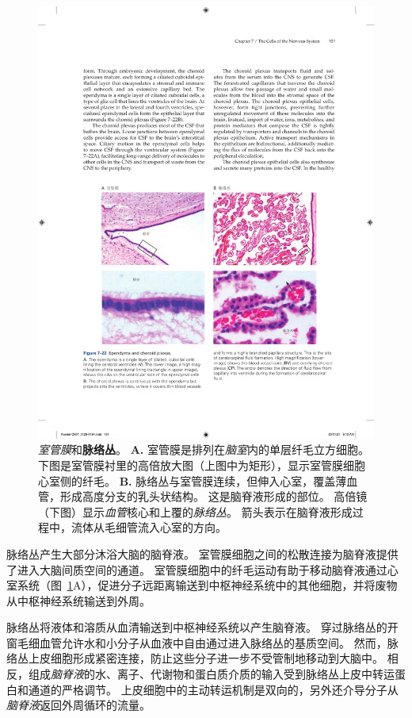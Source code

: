 \begin{figure}[htbp]
	\centering
	\includegraphics[width=0.8\linewidth]{chap07/fig_7_22}
	\caption{\textit{室管膜}和\textbf{脉络丛}。
		\textbf{A.} 室管膜是排列在\textit{脑室}内的单层纤毛立方细胞。
		下图是室管膜衬里的高倍放大图（上图中为矩形），显示室管膜细胞心室侧的纤毛。
		\textbf{B.} 脉络丛与室管膜连续，但伸入心室，覆盖薄血管，形成高度分支的乳头状结构。
		这是脑脊液形成的部位。
		高倍镜（下图）显示\textit{血管}核心和上覆的\textit{脉络丛}。
		箭头表示在脑脊液形成过程中，流体从毛细管流入心室的方向。}
	\label{fig:7_22}
\end{figure}


脉络丛产生大部分沐浴大脑的脑脊液。
室管膜细胞之间的松散连接为脑脊液提供了进入大脑间质空间的通道。
室管膜细胞中的纤毛运动有助于移动脑脊液通过心室系统（图~\ref{fig:7_22}A），促进分子远距离输送到中枢神经系统中的其他细胞，并将废物从中枢神经系统输送到外周。


脉络丛将液体和溶质从血清输送到中枢神经系统以产生脑脊液。
穿过脉络丛的开窗毛细血管允许水和小分子从血液中自由通过进入脉络丛的基质空间。
然而，脉络丛上皮细胞形成紧密连接，防止这些分子进一步不受管制地移动到大脑中。
相反，组成\textit{脑脊液}的水、离子、代谢物和蛋白质介质的输入受到脉络丛上皮中转运蛋白和通道的严格调节。
上皮细胞中的主动转运机制是双向的，另外还介导分子从\textit{脑脊液}返回外周循环的流量。


